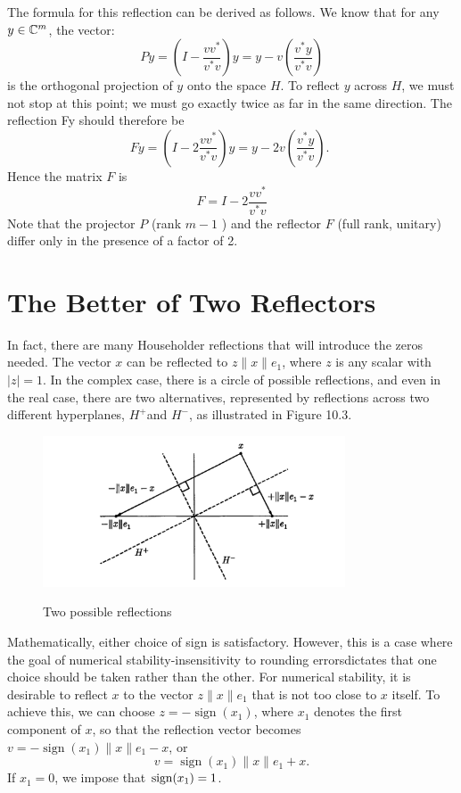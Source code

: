 The formula for this reflection can be derived as follows. We know that for any $y\in \mathbb{C}^m$, the vector: 
\[
    P y=\left(I-\frac{v v^*}{v^* v}\right) y=y-v\left(\frac{v^* y}{v^* v}\right)
\]
is the orthogonal projection of $y$ onto the space $H$. To reflect $y$ across $H$, we must not stop at this point; we must go exactly twice as far in the same direction. The reflection Fy should therefore be
$$
F y=\left(I-2 \frac{v v^*}{v^* v}\right) y=y-2 v\left(\frac{v^* y}{v^* v}\right) \text {. }
$$
Hence the matrix $F$ is
$$
F=I-2 \frac{v v^*}{v^* v}
$$
Note that the projector $P$ (rank $m-1$ ) and the reflector $F$ (full rank, unitary) differ only in the presence of a factor of 2.

\section{The Better of Two Reflectors} 
In fact, there are many Householder reflections that will introduce the zeros needed. The vector $x$ can be reflected to $z\|x\| e_1$, where $z$ is any scalar with $|z|=1$. In the complex case, there is a circle of possible reflections, and even in the real case, there are two alternatives, represented by reflections across two different hyperplanes, $H^{+}$and $H^{-}$, as illustrated in Figure 10.3.
\begin{figure}[H]
    \centering
    \includegraphics[width=0.8\textwidth]{figures/10-3.png}
    \label{fig 10.3}
    \caption{Two possible reflections}
\end{figure}
Mathematically, either choice of sign is satisfactory. However, this is a case where the goal of numerical stability-insensitivity to rounding errorsdictates that one choice should be taken rather than the other. For numerical stability, it is desirable to reflect $x$ to the vector $z\|x\| e_1$ that is not too close to $x$ itself. To achieve this, we can choose $z=-\operatorname{sign}\left(x_1\right)$, where $x_1$ denotes the first component of $x$, so that the reflection vector becomes $v=-\operatorname{sign}\left(x_1\right)\|x\| e_1-x$, or 
\[
    v=\operatorname{sign}\left(x_1\right)\|x\| e_1+x. 
\]
If $x_1=0$, we impose that $\mathop{\mathrm{sign}}(x_1)=1$. 

